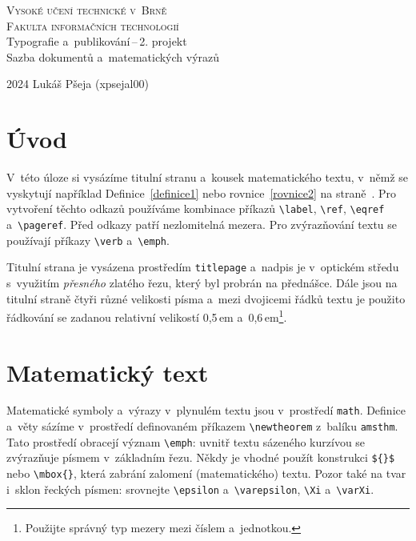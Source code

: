 \documentclass[11pt, twocolumn]{article}[15.03.2024]
\begin{document}
\begin{titlepage}
    \begin{center}
        \Huge{\textsc{Vysoké učení technické v~Brně\\[0.5em]\huge{Fakulta informačních technologií}}}
        \LARGE{\\Typografie a~publikování\,--\,2. projekt\\[0.6em]Sazba dokumentů a~matematických výrazů}
    \end{center}
    {\Large 2024 \hfill Lukáš Pšeja (xpsejal00)}
\end{titlepage}

\section*{Úvod} \label{strana1}
    V~této úloze si vysázíme titulní stranu a~kousek matematického textu, v~němž se vyskytují například Definice~\ref{definice1} nebo rovnice~\eqref{rovnice2} na straně~\pageref{strana1}. Pro vytvoření těchto odkazů používáme kombinace příkazů \verb|\label|, \verb|\ref|, \verb|\eqref| a~\verb|\pageref|. Před odkazy patří nezlomitelná mezera. Pro zvýrazňování textu se používají příkazy \verb|\verb| a~\verb|\emph|.

    Titulní strana je vysázena prostředím \verb|titlepage| a~nadpis je v~optickém středu s~využitím \emph{přesného} zlatého řezu, který byl probrán na přednášce. Dále jsou na titulní straně čtyři různé velikosti písma a~mezi dvojicemi řádků textu je použito řádkování se zadanou relativní velikostí 0{,}5\,em a~0{,}6\,em\footnote{Použijte správný typ mezery mezi číslem a~jednotkou.}.

\section{Matematický text}
    Matematické symboly a~výrazy v~plynulém textu jsou v~prostředí \verb|math|. Definice a~věty sázíme v~prostředí definovaném příkazem \verb|\newtheorem| z~balíku \verb|amsthm|. Tato prostředí obracejí význam \verb|\emph|: uvnitř textu sázeného kurzívou se zvýrazňuje písmem v~základním řezu. Někdy je vhodné použít konstrukci \verb|${}$| nebo \verb|\mbox{}|, která zabrání zalomení (matematického) textu. Pozor také na tvar i~sklon řeckých písmen: srovnejte \verb|\epsilon| a~\verb|\varepsilon|, \verb|\Xi| a~\verb|\varXi|.
\end{document}
